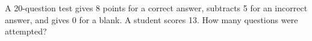 A 20-question test gives 8 points for a correct answer, subtracts 5 for an incorrect answer, and gives 0 for a blank. A student scores 13. How many questions were attempted?
